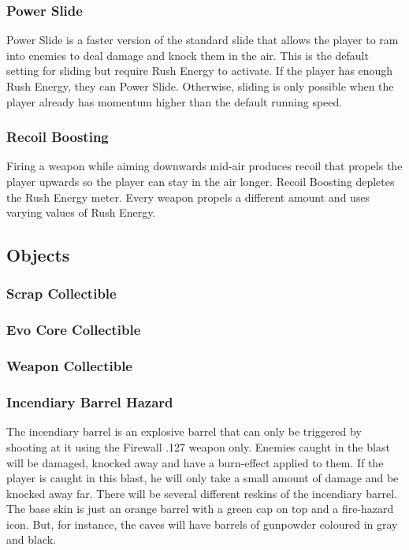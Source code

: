 \documentclass[12pt]{article}
\begin{document}
\subsubsection{Power Slide}

Power Slide is a faster version of the standard slide that allows the player to ram into enemies to deal damage and knock them in the air. This is the default setting for sliding but require Rush Energy to activate. If the player has enough Rush Energy, they can Power Slide. Otherwise, sliding is only possible when the player already has momentum higher than the default running speed. 

\subsubsection{Recoil Boosting}

Firing a weapon while aiming downwards mid-air produces recoil that propels the player upwards so the player can stay in the air longer. Recoil Boosting depletes the Rush Energy meter. Every weapon propels a different amount and uses varying values of Rush Energy. 

\subsection{Objects}

\subsubsection{Scrap Collectible}

\subsubsection{Evo Core Collectible}

\subsubsection{Weapon Collectible}

\subsubsection{Incendiary Barrel Hazard}

The incendiary barrel is an explosive barrel that can only be triggered by shooting at it using the Firewall .127 weapon only. Enemies caught in the blast will be damaged, knocked away and have a burn-effect applied to them. If the player is caught in this blast, he will only take a small amount of damage and be knocked away far. There will be several different reskins of the incendiary barrel. The base skin is just an orange barrel with a green cap on top and a fire-hazard icon. But, for instance, the caves will have barrels of gunpowder coloured in gray and black. 
\end{document}
